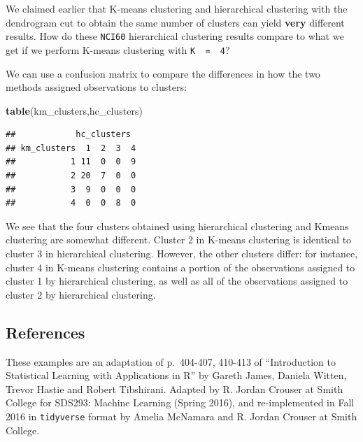 \documentclass[openany]{book}
\newenvironment{Shaded}{\begin{snugshade}}{\end{snugshade}}
\newcommand{\DataTypeTok}[1]{\textcolor[rgb]{0.13,0.29,0.53}{#1}}
\newcommand{\DecValTok}[1]{\textcolor[rgb]{0.00,0.00,0.81}{#1}}
\newcommand{\KeywordTok}[1]{\textcolor[rgb]{0.13,0.29,0.53}{\textbf{#1}}}
\newcommand{\NormalTok}[1]{#1}
\newcommand{\OperatorTok}[1]{\textcolor[rgb]{0.81,0.36,0.00}{\textbf{#1}}}
\newcommand{\StringTok}[1]{\textcolor[rgb]{0.31,0.60,0.02}{#1}}
\begin{document}
We claimed earlier that K-means clustering and hierarchical
clustering with the dendrogram cut to obtain the same number
of clusters can yield \textbf{very} different results. How do these \texttt{NCI60} hierarchical
clustering results compare to what we get if we perform K-means clustering
with \texttt{K\ \ =\ \ 4}?

\begin{Shaded}
\end{Shaded}

We can use a confusion matrix to compare the differences in how the two methods assigned observations to clusters:

\begin{Shaded}
\begin{Highlighting}[]
\KeywordTok{table}\NormalTok{(km_clusters,hc_clusters)}
\end{Highlighting}
\end{Shaded}

\begin{verbatim}
##            hc_clusters
## km_clusters  1  2  3  4
##           1 11  0  0  9
##           2 20  7  0  0
##           3  9  0  0  0
##           4  0  0  8  0
\end{verbatim}

We see that the four clusters obtained using hierarchical clustering and Kmeans
clustering are somewhat different. Cluster 2 in K-means clustering is
identical to cluster 3 in hierarchical clustering. However, the other clusters
differ: for instance, cluster 4 in K-means clustering contains a portion of
the observations assigned to cluster 1 by hierarchical clustering, as well as
all of the observations assigned to cluster 2 by hierarchical clustering.

\hypertarget{references-1}{%
\subsection{References}\label{references-1}}

These examples are an adaptation of p.~404-407, 410-413 of ``Introduction to
Statistical Learning with Applications in R'' by Gareth James, Daniela Witten, Trevor Hastie and Robert
Tibshirani. Adapted by R. Jordan Crouser at Smith College for SDS293: Machine Learning (Spring 2016), and re-implemented in Fall 2016 in \texttt{tidyverse} format by Amelia McNamara and R. Jordan Crouser at Smith College.
\end{document}
